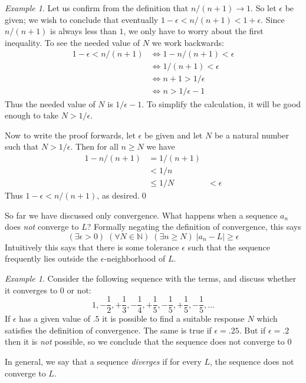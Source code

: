 \documentclass[11pt,oneside]{amsbook}
\newcommand{\N}{\mathbb N}
\theoremstyle{definition}
\theoremstyle{plain}
\theoremstyle{definition}
\theoremstyle{remark}
\newtheorem{example}[theorem]{Example}
\numberwithin{equation}{section}
\numberwithin{figure}{section}
\begin{document}
\begin{example}
  Let us confirm from the definition that $n/(n+1)\to1$. So let $\epsilon$ be given; we wish to conclude that eventually $1-\epsilon<n/(n+1)<1+\epsilon$. Since $n/(n+1)$ is always less than $1$, we only have to worry about the first inequality. To see the needed value of $N$ we work backwards:
  \begin{align*}
    1-\epsilon<n/(n+1)&\iff 1-n/(n+1)<\epsilon \\
                      &\iff 1/(n+1)<\epsilon \\
                      &\iff n+1>1/\epsilon \\
                      &\iff n>1/\epsilon-1
  \end{align*}
  Thus the needed value of $N$ is $1/\epsilon-1$. To simplify the calculation, it will be good enough to take $N>1/\epsilon$.
  
  Now to write the proof forwards, let $\epsilon$ be given and let $N$ be a natural number such that $N>1/\epsilon$. Then for all $n\geq N$ we have
  \begin{align*}
    1-n/(n+1) &= 1/(n+1)\\
              &< 1/n\\
              &\leq 1/N
              &<\epsilon
  \end{align*}
  Thus $1-\epsilon < n/(n+1)$, as desired.\qed
\end{example}

So far we have discussed only convergence. What happens when a sequence $a_n$ does \emph{not} converge to $L$? Formally negating the definition of convergence, this says
\[(\exists\epsilon>0)\;(\forall N\in\N)\;(\exists n\geq N)\;|a_n-L|\geq\epsilon
\]
Intuitively this says that there is some tolerance $\epsilon$ such that the sequence frequently lies outside the $\epsilon$-neighborhood of $L$.

\begin{example}
  Consider the following sequence with the terms, and discuss whether it converges to $0$ or not:
  \[1,-\frac12,+\frac13,-\frac14,+\frac15,-\frac15,+\frac15,-\frac15,\ldots
  \]
  If $\epsilon$ has a given value of $.5$ it is possible to find a suitable response $N$ which satisfies the definition of convergence. The same is true if $\epsilon=.25$. But if $\epsilon=.2$ then it is \emph{not} possible, so we conclude that the sequence does not converge to $0$
\end{example}

In general, we say that a sequence \emph{diverges} if for every $L$, the sequence does not converge to $L$.
\end{document}
